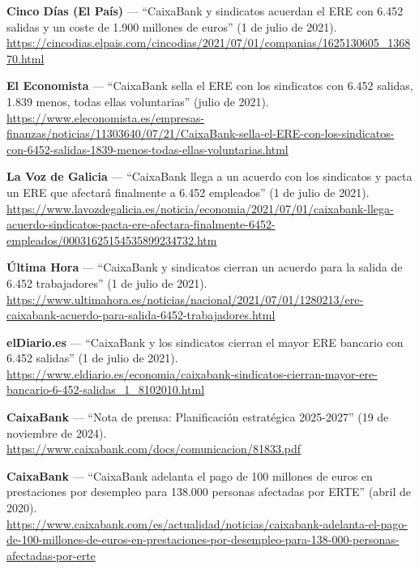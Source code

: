 \begin{enumerate}[label={[\arabic*]}]

  \item \textbf{Cinco Días (El País)} --- ``CaixaBank y sindicatos acuerdan
        el ERE con 6.452 salidas y un coste de 1.900 millones de euros''
        (1 de julio de 2021).\\
        \url{https://cincodias.elpais.com/cincodias/2021/07/01/companias/1625130605_136870.html}

  \item \textbf{El Economista} --- ``CaixaBank sella el ERE con los sindicatos
        con 6.452 salidas, 1.839 menos, todas ellas voluntarias''
        (julio de 2021).\\
        \url{https://www.eleconomista.es/empresas-finanzas/noticias/11303640/07/21/CaixaBank-sella-el-ERE-con-los-sindicatos-con-6452-salidas-1839-menos-todas-ellas-voluntarias.html}

  \item \textbf{La Voz de Galicia} --- ``CaixaBank llega a un acuerdo con
        los sindicatos y pacta un ERE que afectará finalmente a 6.452
        empleados'' (1 de julio de 2021).\\
        \url{https://www.lavozdegalicia.es/noticia/economia/2021/07/01/caixabank-llega-acuerdo-sindicatos-pacta-ere-afectara-finalmente-6452-empleados/00031625154535899234732.htm}

  \item \textbf{Última Hora} --- ``CaixaBank y sindicatos cierran un acuerdo
        para la salida de 6.452 trabajadores'' (1 de julio de 2021).\\
        \url{https://www.ultimahora.es/noticias/nacional/2021/07/01/1280213/ere-caixabank-acuerdo-para-salida-6452-trabajadores.html}

  \item \textbf{elDiario.es} --- ``CaixaBank y los sindicatos cierran el
        mayor ERE bancario con 6.452 salidas'' (1 de julio de 2021).\\
        \url{https://www.eldiario.es/economia/caixabank-sindicatos-cierran-mayor-ere-bancario-6-452-salidas_1_8102010.html}

  \item \textbf{CaixaBank} --- ``Nota de prensa: Planificación estratégica 2025-2027'' (19 de noviembre de 2024).\\
        \url{https://www.caixabank.com/docs/comunicacion/81833.pdf}

  \item \textbf{CaixaBank} --- ``CaixaBank adelanta el pago de 100 millones de euros en prestaciones por desempleo para 138.000 personas afectadas por ERTE'' (abril de 2020).\\
        \url{https://www.caixabank.com/es/actualidad/noticias/caixabank-adelanta-el-pago-de-100-millones-de-euros-en-prestaciones-por-desempleo-para-138-000-personas-afectadas-por-erte}

\end{enumerate}

